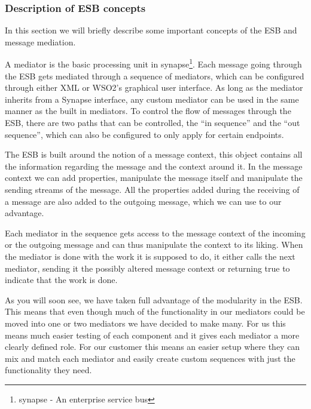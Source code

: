     \subsubsection{Description of ESB concepts}\label{Description of ESB concepts} 

    In this section we will briefly describe some important concepts of the ESB and message mediation.

    A mediator is the basic processing unit in \gls{synapse}\footnote{\gls{synapse} - An enterprise service bus}. Each message going through the ESB gets mediated through a sequence of mediators, which can be configured through either XML or WSO2’s graphical user interface. As long as the mediator inherits from a Synapse interface, any custom mediator can be used in the same manner as the built in mediators. To control the flow of messages through the ESB, there are two paths that can be controlled, the “in sequence” and the “out sequence”, which can also be configured to only apply for certain endpoints.

    The ESB is built around the notion of a message context, this object contains all the information regarding the message and the context around it. In the message context we can add properties, manipulate the message itself and manipulate the sending streams of the message. All the properties added during the receiving of a message are also added to the outgoing message, which we can use to our advantage.

    Each mediator in the sequence gets access to the message context of the incoming or the outgoing message and can thus manipulate the context to its liking. When the mediator is done with the work it is supposed to do, it either calls the next mediator, sending it the possibly altered message context or returning true to indicate that the work is done.
    
    As you will soon see, we have taken full advantage of the modularity in the ESB. This means that even though much of the functionality in our mediators could be moved into one or two mediators we have decided to make many. For us this means much easier testing of each component and it gives each mediator a more clearly defined role. For our customer this means an easier setup where they can mix and match each mediator and easily create custom sequences with just the functionality they need.


